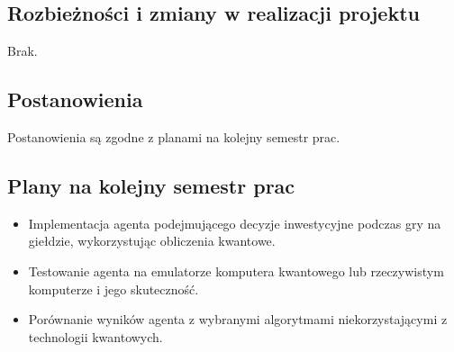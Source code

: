 \documentclass[polish,envcountsect,10pt]{article}
\begin{document}
\subsection{Rozbieżności i zmiany w realizacji projektu}
Brak.
\subsection{Postanowienia}
Postanowienia są zgodne z planami na kolejny semestr prac.
\subsection{Plany na kolejny semestr prac}
\begin{itemize}
	\item Implementacja agenta podejmującego decyzje inwestycyjne podczas gry na giełdzie, wykorzystując obliczenia kwantowe.
	\item Testowanie agenta na emulatorze komputera kwantowego lub rzeczywistym komputerze i jego skuteczność.
	\item Porównanie wyników agenta z wybranymi algorytmami niekorzystającymi z technologii	kwantowych.
\end{itemize}
\end{document}
